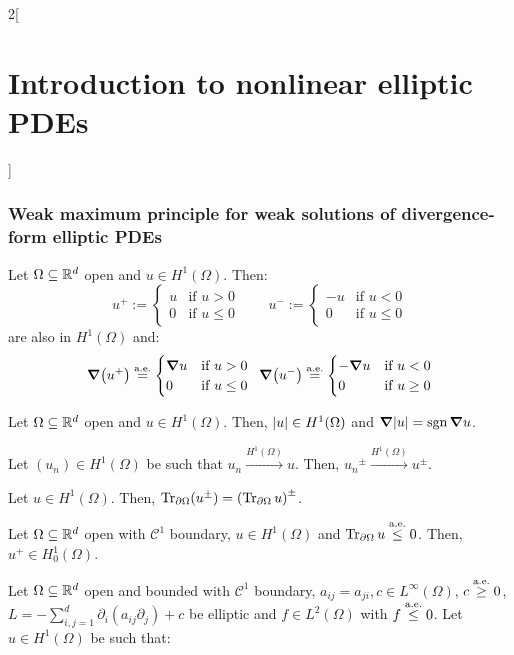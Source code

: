 \documentclass[../../../main_math.tex]{subfiles}
\begin{document}
\begin{multicols}{2}[\section{Introduction to nonlinear elliptic PDEs}]
  \subsubsection{Weak maximum principle for weak solutions of divergence-form elliptic PDEs}
  \begin{lemma}
    Let $\Omega\subseteq\mathbb{R}^d$ open and $u\in H^1(\Omega)$. Then:
    $$
      u^{+}:=\begin{cases}
        u & \text{if }u> 0    \\
        0 & \text{if }u\leq 0
      \end{cases}\qquad
      u^{-}:=\begin{cases}
        -u & \text{if }u< 0    \\
        0  & \text{if }u\leq 0
      \end{cases}
    $$
    are also in $H^1(\Omega)$ and:
    $$
      \grad(u^+)\overset{\text{a.e.}}{=}\begin{cases}
        \grad u & \text{if }u>0     \\
        0       & \text{if }u\leq 0
      \end{cases}\;\;
      \grad(u^-)\overset{\text{a.e.}}{=}\begin{cases}
        -\grad u & \text{if }u<0     \\
        0        & \text{if }u\geq 0
      \end{cases}
    $$
  \end{lemma}
  \begin{corollary}
    Let $\Omega\subseteq\mathbb{R}^d$ open and $u\in H^1(\Omega)$. Then, $\abs{u}\in H^1(\Omega)$ and $\grad{\abs{u}}=\operatorname{sgn}\grad{u}$.
  \end{corollary}
  \begin{lemma}
    Let $(u_n)\in H^1(\Omega)$ be such that $u_n\overset{H^1(\Omega)}{\longrightarrow} u$. Then, ${u_n}^\pm\overset{H^1(\Omega)}{\longrightarrow} u^\pm$.
  \end{lemma}
  \begin{corollary}
    Let $u\in H^1(\Omega)$. Then, $\Tr_{\partial\Omega}(u^\pm)={(\Tr_{\partial\Omega}u)}^\pm$.
  \end{corollary}
  \begin{lemma}
    Let $\Omega\subseteq\mathbb{R}^d$ open with $\mathcal{C}^1$ boundary, $u\in H^1(\Omega)$ and $\Tr_{\partial\Omega}u\overset{\text{a.e.}}{\leq}0$. Then, $u^+\in H^1_0(\Omega)$.
  \end{lemma}
  \begin{theorem}
    Let $\Omega\subseteq\mathbb{R}^d$ open and bounded with $\mathcal{C}^1$ boundary, $a_{ij}=a_{ji},c\in L^\infty(\Omega)$, $c\overset{\text{a.e.}}{\geq}0$, $L=-\sum_{i,j=1}^d\partial_i(a_{ij}\partial_j)+c$ be elliptic and $f\in L^2(\Omega)$ with $f\overset{\text{a.e.}}{\leq} 0$. Let $u\in H^1(\Omega)$ be such that:

\end{theorem}
\end{multicols}
\end{document}

